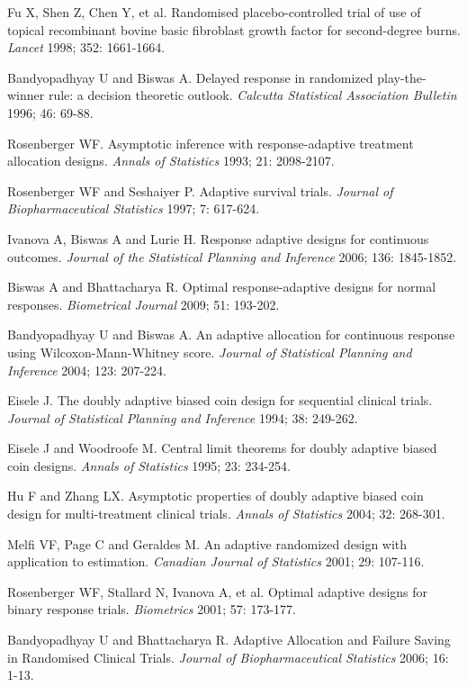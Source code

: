 \begin{thebibliography}
  Fu X, Shen Z, Chen Y, et al. Randomised placebo-controlled trial of use of topical recombinant bovine basic fibroblast growth factor for second-degree burns. \textit{Lancet} 1998; 352: 1661-1664.

 Bandyopadhyay U and Biswas A. Delayed response in randomized play-the-winner rule: a  decision  theoretic outlook. \textit{Calcutta Statistical Association Bulletin} 1996; 46: 69-88.

 Rosenberger WF.  Asymptotic inference with response-adaptive treatment allocation designs. \textit{Annals of Statistics} 1993; 21: 2098-2107.

 Rosenberger WF and Seshaiyer P. Adaptive survival trials. \textit{Journal of Biopharmaceutical Statistics} 1997; 7: 617-624.

 Ivanova A, Biswas A and Lurie H. Response adaptive designs for continuous outcomes. \textit{Journal of the Statistical Planning and Inference} 2006; 136: 1845-1852.

 Biswas A  and Bhattacharya R. Optimal response-adaptive designs for normal responses. \textit{Biometrical Journal} 2009; 51: 193-202.

 Bandyopadhyay U and Biswas A. An adaptive allocation for continuous response using Wilcoxon-Mann-Whitney score. \textit{Journal of Statistical Planning and Inference} 2004; 123: 207-224.

 Eisele J.  The doubly adaptive biased coin design for sequential clinical trials. \textit{Journal of Statistical Planning and Inference} 1994; 38: 249-262.

 Eisele J and Woodroofe M. Central limit theorems for doubly adaptive biased coin designs. \textit{Annals of Statistics} 1995; 23: 234-254.

 Hu F and Zhang LX. Asymptotic properties of doubly adaptive biased coin design for multi-treatment clinical trials. \textit{Annals of Statistics} 2004; 32: 268-301.

 Melfi VF, Page C and Geraldes M. An adaptive randomized design with application to estimation. \textit{Canadian Journal of Statistics} 2001; 29: 107-116.

 Rosenberger WF, Stallard N, Ivanova A, et al.  Optimal adaptive designs for binary response trials. \textit{Biometrics} 2001; 57: 173-177.

 Bandyopadhyay U and Bhattacharya R. Adaptive Allocation and Failure Saving in Randomised Clinical Trials. \textit{Journal of Biopharmaceutical Statistics} 2006; 16: 1-13.


\end{thebibliography}

